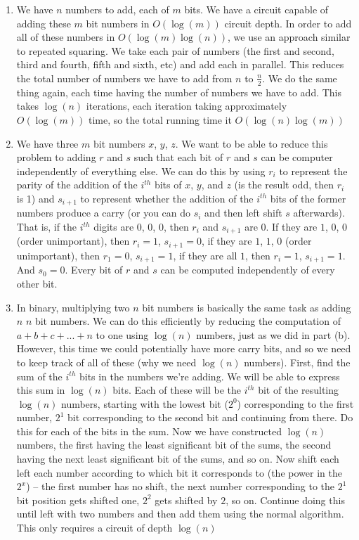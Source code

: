 \documentclass[11pt]{article}
\begin{document}
\begin{enumerate}
\begin{enumerate}

\item
We have $n$ numbers to add, each of $m$ bits. We have a circuit capable of adding these $m$ bit numbers in $O(\log(m))$ circuit depth. In order to add all of these numbers in $O(\log(m)\log(n))$, we use an approach similar to repeated squaring. We take each pair of numbers (the first and second, third and fourth, fifth and sixth, etc) and add each in parallel. This reduces the total number of numbers we have to add from $n$ to $\frac{n}{2}$. We do the same thing again, each time having the number of numbers we have to add. This takes $\log(n)$ iterations, each iteration taking approximately $O(\log(m))$ time, so the total running time it $O(\log(n)\log(m))$

\item
We have three $m$ bit numbers $x$, $y$, $z$. We want to be able to reduce this problem to adding $r$ and $s$ such that each bit of $r$ and $s$ can be computer independently of everything else. We can do this by using $r_i$ to represent the parity of the addition of the $i^{th}$ bits of $x$, $y$, and $z$ (is the result odd, then $r_i$ is 1) and $s_{i+1}$ to represent whether the addition of the $i^{th}$ bits of the former numbers produce a carry (or you can do $s_i$ and then left shift $s$ afterwards). That is, if the $i^{th}$ digits are $0$, $0$, $0$, then $r_i$ and $s_{i+1}$ are $0$. If they are $1$, $0$, $0$ (order unimportant), then $r_i=1$, $s_{i+1}=0$, if they are $1$, $1$, $0$ (order unimportant), then $r_1=0$, $s_{i+1}=1$, if they are all $1$, then $r_i=1$, $s_{i+1}=1$. And $s_0=0$. Every bit of $r$ and $s$ can be computed independently of every other bit.

\item
In binary, multiplying two $n$ bit numbers is basically the same task as adding $n$ $n$ bit numbers. We can do this efficiently by reducing the computation of $a+b+c+...+n$ to one using $\log(n)$ numbers, just as we did in part (b). However, this time we could potentially have more carry bits, and so we need to keep track of all of these (why we need $\log(n)$ numbers). First, find the sum of the $i^{th}$ bits in the numbers we're adding. We will be able to express this sum in $\log(n)$ bits. Each of these will be the $i^{th}$ bit of the resulting $\log(n)$ numbers, starting with the lowest bit ($2^0$) corresponding to the first number, $2^1$ bit corresponding to the second bit and continuing from there. Do this for each of the bits in the sum. Now we have constructed $\log(n)$ numbers, the first having the least significant bit of the sums, the second having the next least significant bit of the sums, and so on. Now shift each left each number according to which bit it corresponds to (the power in the $2^x$) -- the first number has no shift, the next number corresponding to the $2^1$ bit position gets shifted one, $2^2$ gets shifted by $2$, so on. Continue doing this until left with two numbers and then add them using the normal algorithm. This only requires a circuit of depth $\log(n)$

\end{enumerate}



\end{enumerate}
\end{document}
